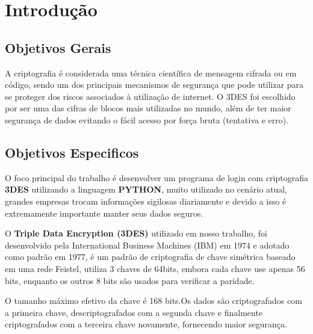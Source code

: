 





\textual\newpage
\chapter{\textbf{Introdução}}

\section{\textbf{Objetivos Gerais}}
\par A criptografia é considerada uma técnica científica de mensagem cifrada ou em código, sendo um dos principais mecanismos de segurança que pode utilizar para se proteger dos riscos associados à utilização de internet. O 3DES foi escolhido por ser uma das cifras de blocos mais utilizadas no mundo, além de ter maior segurança de dados evitando o fácil acesso por força bruta (tentativa e erro).

\section{\textbf{Objetivos Especificos}}
\par O foco principal do trabalho é desenvolver um programa de login com criptografia \textbf{3DES} utilizando a linguagem \textbf{PYTHON}, muito utilizado no cenário atual, grandes empresas trocam informações sigilosas diariamente e devido a isso é extremamente importante manter seus dados seguros. 

\par O \textbf{Triple Data Encryption (3DES)} utilizado em nosso trabalho, foi desenvolvido pela International Business Machines (IBM) em 1974 e adotado como padrão em 1977, é um padrão de criptografia de chave simétrica baseado em uma rede Feistel, utiliza 3 chaves de 64bits, embora cada chave use apenas 56 bits, enquanto os outros 8 bits são usados para verificar a paridade.

\par O tamanho máximo efetivo da chave é 168 bits.Os dados são criptografados com a primeira chave, descriptografados com a segunda chave e finalmente criptografados com a terceira chave novamente, fornecendo maior segurança. 

